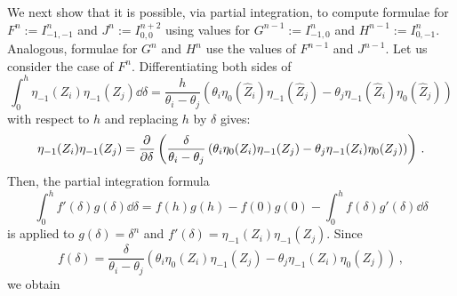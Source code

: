 We next show that it is possible, via partial integration, to compute formulae for $F^{n}:=I_{-1,-1}^{n}$ and $J^{n}:=I_{0,0}^{n+2}$ using values for $G^{n-1}:=I_{-1,0}^{n}$ and $H^{n-1}:=I_{0,-1}^{n}$. Analogous, formulae for $G^{n}$ and $H^{n}$ use the values of $F^{n-1}$ and $J^{n-1}$. Let us consider the case of $F^{n}$. Differentiating both sides of
$$
  \int^{h}_0 \eta_{-1}(Z_i)\eta_{-1}(Z_j)\dd \delta = \frac{h}{\theta_i - \theta_j}\left(\theta_i \eta_0(\hat{Z}_i)\eta_{-1}(\hat{Z}_j) - \theta_j \eta_{-1}(\hat{Z}_i)\eta_0(\hat{Z}_j)\right)
$$
with respect to $h$ and replacing $h$ by $\delta$ gives:
$$
  \eta_{-1}(Z_i)\eta_{-1}(Z_j) = \pdv[]{}{\delta}\left(\frac{\delta}{\theta_i - \theta_j}\left(\theta_i \eta_0(Z_i)\eta_{-1}(Z_j) - \theta_j \eta_{-1}(Z_i)\eta_0(Z_j)\right)\right) \,.
$$
Then, the partial integration formula
$$
  \int_{0}^h f'(\delta)g(\delta) \dd \delta = f(h)g(h) - f(0)g(0) - \int_0^{h} f(\delta) g'(\delta) \dd \delta
$$
is applied to $g(\delta) = \delta^{n}$ and $f'(\delta) = \eta_{-1}(Z_i)\eta_{-1}(Z_j)$. Since
$$
  f(\delta) = \frac{\delta}{\theta_i - \theta_j}\left(\theta_i \eta_0(Z_i)\eta_{-1}(Z_j) - \theta_j \eta_{-1}(Z_i)\eta_0(Z_j)\right)\,,
$$
we obtain
